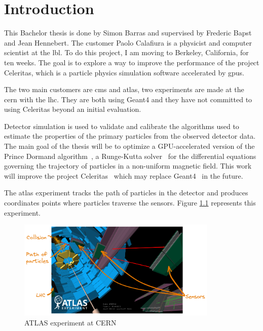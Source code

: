 \chapter{Introduction}
\label{ch:introduction}

This Bachelor thesis is done by Simon Barras and supervised by Frederic Bapst
and Jean Hennebert.
The customer Paolo Calafiura is a physicist and computer scientist at the \acrfull{lbl}.
To do this project, I am moving to Berkeley, California, for ten weeks.
The goal is to explore a way to improve the performance of the project Celeritas,
which is a particle physics simulation software accelerated by \acrshort{gpu}s.

The two main customers are \acrshort{cms} and \acrshort{atlas}, two experiments
are made at the \acrfull{cern} with the \acrfull{lhc}.
They are both using Geant4 and they have not committed to using Celeritas
beyond an initial evaluation.

Detector simulation is used to validate and calibrate the algorithms used to
estimate the properties of the primary particles from the observed detector data.
The main goal of the thesis will be to optimize a GPU-accelerated version of
the Prince Dormand algorithm~\cite{princeDormand}, a
Runge-Kutta solver~\cite{Runge-Kutta-methods} for the differential equations
governing the trajectory of particles in a non-uniform magnetic field.
This work will improve the project Celeritas~\cite{Celeritas-Project} which may
replace Geant4~\cite{geant4} in the future.

The \acrshort{atlas} experiment tracks the path of particles in the detector and
produces coordinates points where particles traverse the sensors.
Figure \ref{fig:introduction:particles:tracking} represents this experiment.
\begin{figure}[ht]
    \centering
    \includegraphics[width=0.85\textwidth]{05-resources/img/spec/experiment-atlas.excalidraw.png}
    \caption{ATLAS experiment at CERN~\cite{atlas-experiment}}
    \label{fig:introduction:particles:tracking}
\end{figure}

